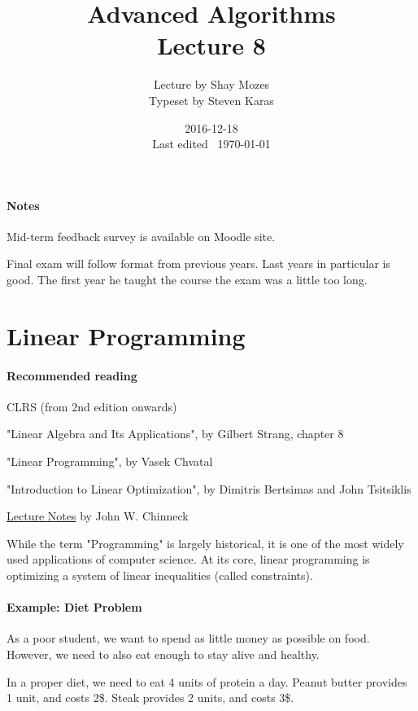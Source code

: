\documentclass[a4paper]{article}
\title{Advanced Algorithms\\\large Lecture 8}
\date{2016-12-18 \\ Last edited \currenttime\ \today}
\author{Lecture by Shay Mozes\\Typeset by Steven Karas}
\newenvironment{itemize*}%
  {\begin{itemize}%
    \setlength{\itemsep}{0pt}%
    \setlength{\parsep}{0pt}%
    \setlength{\parskip}{0pt}}%
  {\end{itemize}}
\begin{document}
\maketitle

\paragraph{Notes}

Mid-term feedback survey is available on Moodle site.

Final exam will follow format from previous years.
Last years in particular is good.
The first year he taught the course the exam was a little too long.

\section{Linear Programming}

\paragraph{Recommended reading}
\begin{itemize*}
  \item CLRS (from 2nd edition onwards)
  \item "Linear Algebra and Its Applications", by Gilbert Strang, chapter 8
  \item "Linear Programming", by Vasek Chvatal
  \item "Introduction to Linear Optimization", by Dimitris Bertsimas and John Tsitsiklis
  \item \href{http://www.sce.carleton.ca/faculty/chinneck/po.html}{Lecture Notes} by John W. Chinneck
\end{itemize*}

While the term "Programming" is largely historical, it is one of the most widely used applications of computer science.
At its core, linear programming is optimizing a system of linear inequalities (called constraints).

\paragraph{Example: Diet Problem}
As a poor student, we want to spend as little money as possible on food. However, we need to also eat enough to stay alive and healthy.

In a proper diet, we need to eat 4 units of protein a day. Peanut butter provides 1 unit, and costs 2\$. Steak provides 2 units, and costs 3\$.
\end{document}
